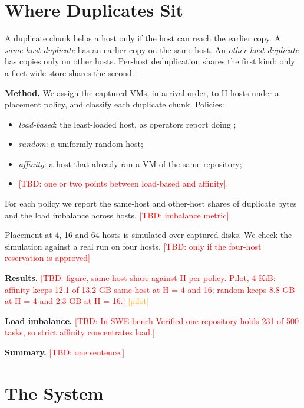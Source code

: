 \documentclass[10pt,twocolumn]{article}
\newcommand{\TBD}[1]{\textcolor{red}{[TBD: #1]}}
\newcommand{\pilot}{\textcolor{orange}{[pilot]}}
\begin{document}
\section{Where Duplicates Sit}

A duplicate chunk helps a host only if the host can reach the earlier copy. A \emph{same-host duplicate} has an earlier copy on the same host. An \emph{other-host duplicate} has copies only on other hosts. Per-host deduplication shares the first kind; only a fleet-wide store shares the second.

\textbf{Method.} We assign the captured VMs, in arrival order, to H hosts under a placement policy, and classify each duplicate chunk. Policies:

\begin{itemize}
\item \emph{load-based}: the least-loaded host, as operators report doing \cite{dsec};

\item \emph{random}: a uniformly random host;

\item \emph{affinity}: a host that already ran a VM of the same repository;

\item \TBD{one or two points between load-based and affinity}.

\end{itemize}

For each policy we report the same-host and other-host shares of duplicate bytes and the load imbalance across hosts. \TBD{imbalance metric}

Placement at 4, 16 and 64 hosts is simulated over captured disks. We check the simulation against a real run on four hosts. \TBD{only if the four-host reservation is approved}

\textbf{Results.} \TBD{figure, same-host share against H per policy. Pilot, 4 KiB: affinity keeps 12.1 of 13.2 GB same-host at H = 4 and 16; random keeps 8.8 GB at H = 4 and 2.3 GB at H = 16.} \pilot{}

\textbf{Load imbalance.} \TBD{In SWE-bench Verified one repository holds 231 of 500 tasks, so strict affinity concentrates load.}

\textbf{Summary.} \TBD{one sentence.}

\section{The System}
\end{document}
